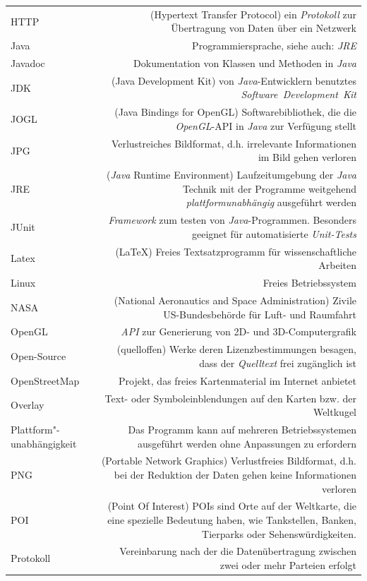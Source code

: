 \documentclass[10pt]{scrreprt}
\newcommand{\textref}[1]{\mbox{\raisebox{0.1ex}{\small$\rightarrow$ }\textit{#1}}}
\begin{document}
\begin{longtabu}{L{0.35} R{1.65}}
HTTP & (Hypertext Transfer Protocol) ein \textref{Protokoll} zur Übertragung von Daten über ein Netzwerk\\
Java & Programmiersprache, siehe auch: \textref{JRE}\\
Javadoc & Dokumentation von Klassen und Methoden in \textref{Java}\\
JDK & (Java Development Kit) von \textref{Java}-Entwicklern benutztes \textref{Software Development Kit}\\
JOGL & (Java Bindings for OpenGL) Softwarebibliothek, die die \textref{OpenGL}-API in \textref{Java} zur Verfügung stellt\\
JPG & Verlustreiches Bildformat, d.h. irrelevante Informationen im Bild  gehen verloren\\
JRE & (\textref{Java} Runtime Environment) Laufzeitumgebung der \textref{Java} Technik mit der Programme weitgehend \textref{plattformunabhängig} ausgeführt werden\\
JUnit & \textref{Framework} zum testen von \textref{Java}-Programmen. Besonders geeignet für automatisierte \textref{Unit-Tests}\\
Latex & (\LaTeX) Freies Textsatzprogramm für wissenschaftliche Arbeiten\\
Linux & Freies Betriebssystem\\
NASA & (National Aeronautics and Space Administration) Zivile US-Bundesbehörde für Luft- und Raumfahrt\\
OpenGL & \textref{API} zur Generierung von 2D- und 3D-Computergrafik\\
Open-Source & (quelloffen) Werke deren Lizenzbestimmungen besagen, dass der \textref{Quelltext} frei zugänglich ist\\
OpenStreetMap & Projekt, das freies Kartenmaterial im Internet anbietet\\
Overlay & Text- oder Symboleinblendungen auf den Karten bzw. der Weltkugel\\
Plattform"-unabhängigkeit & Das Programm kann auf mehreren Betriebssystemen ausgeführt werden ohne Anpassungen zu erfordern\\
PNG & (Portable Network Graphics) Verlustfreies Bildformat, d.h. bei der Reduktion der Daten gehen keine Informationen verloren\\
POI & (Point Of Interest) POIs sind Orte auf der Weltkarte, die eine spezielle Bedeutung haben, wie Tankstellen, Banken, Tierparks oder Sehenswürdigkeiten.\\
Protokoll & Vereinbarung nach der die Datenübertragung zwischen zwei oder mehr Parteien erfolgt\\

\end{longtabu}
\end{document}
